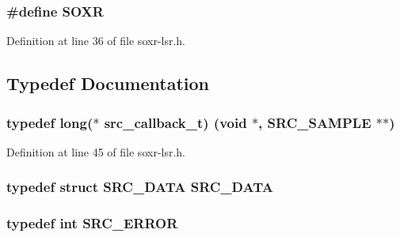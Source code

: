\subsubsection[{\texorpdfstring{S\+O\+XR}{SOXR}}]{\setlength{\rightskip}{0pt plus 5cm}\#define S\+O\+XR}\hypertarget{soxr-lsr_8h_a9c39f225365ddf49e46ae9e6ae9b990a}{}\label{soxr-lsr_8h_a9c39f225365ddf49e46ae9e6ae9b990a}


Definition at line 36 of file soxr-\/lsr.\+h.



\subsection{Typedef Documentation}
\subsubsection[{\texorpdfstring{src\+\_\+callback\+\_\+t}{src_callback_t}}]{\setlength{\rightskip}{0pt plus 5cm}typedef long($\ast$  src\+\_\+callback\+\_\+t) ({\bf void} $\ast$, {\bf S\+R\+C\+\_\+\+S\+A\+M\+P\+LE} $\ast$$\ast$)}\hypertarget{soxr-lsr_8h_a31bec2c13aee016a1c3855a75e757f11}{}\label{soxr-lsr_8h_a31bec2c13aee016a1c3855a75e757f11}


Definition at line 45 of file soxr-\/lsr.\+h.

\subsubsection[{\texorpdfstring{S\+R\+C\+\_\+\+D\+A\+TA}{SRC_DATA}}]{\setlength{\rightskip}{0pt plus 5cm}typedef struct {\bf S\+R\+C\+\_\+\+D\+A\+TA}  {\bf S\+R\+C\+\_\+\+D\+A\+TA}}\hypertarget{soxr-lsr_8h_a40d70d41aa6136a51d313b8282dea773}{}\label{soxr-lsr_8h_a40d70d41aa6136a51d313b8282dea773}
\subsubsection[{\texorpdfstring{S\+R\+C\+\_\+\+E\+R\+R\+OR}{SRC_ERROR}}]{\setlength{\rightskip}{0pt plus 5cm}typedef {\bf int} {\bf S\+R\+C\+\_\+\+E\+R\+R\+OR}}\hypertarget{soxr-lsr_8h_a430d922cd937a18ab0bce9f817baecfe}{}\label{soxr-lsr_8h_a430d922cd937a18ab0bce9f817baecfe}


